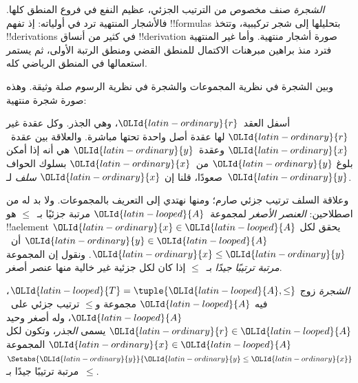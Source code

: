 \documentclass[../../../include/open-logic-section]{subfiles}
\begin{document}

\emph{الشجرة} صنف مخصوص من الترتيب الجزئي، عظيم النفع في فروع
المنطق كلها. فالأشجار المنتهية ترد في أولياته: إذ تفهم
!!{formula}s بتحليلها إلى شجر تركيبية، وتتخذ !!{derivation}s في
كثير من أنساق !!{derivation} صورة أشجار منتهية.
%
وأما غير المنتهية فترد منذ براهين مبرهنات الاكتمال للمنطق القضي
ومنطق الرتبة الأولى، ثم يستمر استعمالها في المنطق الرياضي كله.

وبين الشجرة في نظرية المجموعات والشجرة في نظرية الرسوم صلة وثيقة.
وهذه صورة شجرة منتهية:

\begin{center}
\end{center}

أسفل العقد~$\OLId{latin-ordinary}{r}$، وهي الجذر. وكل عقدة غير $\OLId{latin-ordinary}{r}$ لها عقدة أصل واحدة
تحتها مباشرة. والعلاقة بين عقدة~$\OLId{latin-ordinary}{x}$ وعقدة~$\OLId{latin-ordinary}{y}$ هي أنه إذا أمكن بلوغ $\OLId{latin-ordinary}{y}$ من~$\OLId{latin-ordinary}{x}$ بسلوك
الحواف صعودًا، قلنا إن $\OLId{latin-ordinary}{x}$ \emph{سلف} لـ~$\OLId{latin-ordinary}{y}$.

وعلاقة السلف ترتيب جزئي صارم؛ ومنها نهتدي إلى التعريف بالمجموعات.
ولا بد له من اصطلاحين: \emph{العنصر الأصغر} لمجموعة~$\OLId{latin-looped}{A}$ مرتبة
جزئيًا بـ~$\le$ هو !!a{element} $\OLId{latin-ordinary}{x} \in \OLId{latin-looped}{A}$ يحقق لكل $\OLId{latin-ordinary}{y} \in \OLId{latin-looped}{A}$
أن~$\OLId{latin-ordinary}{x} \le \OLId{latin-ordinary}{y}$. ونقول إن المجموعة \emph{مرتبة ترتيبًا جيدًا}
بـ~$\le$ إذا كان لكل جزئية غير خالية منها عنصر أصغر.

\begin{defn}[الشجرة]
\emph{الشجرة} زوج $\OLId{latin-looped}{T} = \tuple{\OLId{latin-looped}{A}, \le}$، فيه $\OLId{latin-looped}{A}$ مجموعة و$\le$
ترتيب جزئي على~$\OLId{latin-looped}{A}$، وله أصغر وحيد $\OLId{latin-ordinary}{r} \in \OLId{latin-looped}{A}$ يسمى \emph{الجذر}،
وتكون لكل $\OLId{latin-ordinary}{x} \in \OLId{latin-looped}{A}$ المجموعة $\Setabs{\OLId{latin-ordinary}{y}}{\OLId{latin-ordinary}{y} \le \OLId{latin-ordinary}{x}}$ مرتبة ترتيبًا
جيدًا بـ~$\le$.
\end{defn}
\end{document}
